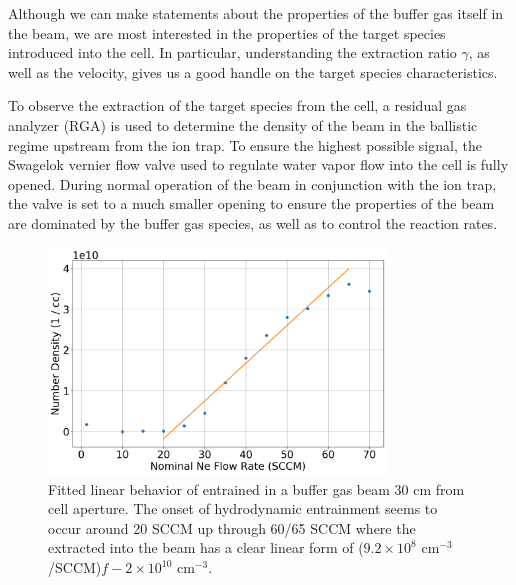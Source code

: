 Although we can make statements about the properties of the buffer gas itself in the beam, we are most interested in the properties of the target species introduced into the cell. In particular, understanding the extraction ratio $\gamma$, as well as the velocity, gives us a good handle on the target species characteristics.

To observe the extraction of the target species from the cell, a residual gas analyzer (RGA) is used to determine the density of the beam in the ballistic regime upstream from the ion trap. To ensure the highest possible signal, the Swagelok vernier flow valve used to regulate water vapor flow into the cell is fully opened. During normal operation of the beam in conjunction with the ion trap, the valve is set to a much smaller opening to ensure the properties of the beam are dominated by the buffer gas species, as well as to control the reaction rates.

\begin{figure}[H]
	\centering
	\includegraphics[width=0.8\textwidth]{images/CBGB_hydrodynamic_fit.png}
	\caption{Fitted linear behavior of  entrained in a  buffer gas beam 30 cm from cell aperture. The onset of hydrodynamic entrainment seems to occur around 20 SCCM up through 60/65 SCCM where the  extracted into the beam has a clear linear form of ($9.2 \times 10^8$ cm$^{-3}$/SCCM)$f - 2 \times 10^{10}$ cm$^{-3}$.}
	\label{fig: rga entrainment}
\end{figure}

